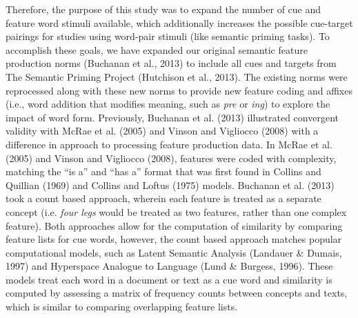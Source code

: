 \documentclass[english,,man]{apa6}
\begin{document}
Therefore, the purpose of this study was to expand the number of cue and feature word stimuli available, which additionally increases the possible cue-target pairings for studies using word-pair stimuli (like semantic priming tasks). To accomplish these goals, we have expanded our original semantic feature production norms (Buchanan et al., 2013) to include all cues and targets from The Semantic Priming Project (Hutchison et al., 2013). The existing norms were reprocessed along with these new norms to provide new feature coding and affixes (i.e., word addition that modifies meaning, such as \emph{pre} or \emph{ing}) to explore the impact of word form. Previously, Buchanan et al. (2013) illustrated convergent validity with McRae et al. (2005) and Vinson and Vigliocco (2008) with a difference in approach to processing feature production data. In McRae et al. (2005) and Vinson and Vigliocco (2008), features were coded with complexity, matching the \enquote{is a} and \enquote{has a} format that was first found in Collins and Quillian (1969) and Collins and Loftus (1975) models. Buchanan et al. (2013) took a count based approach, wherein each feature is treated as a separate concept (i.e. \emph{four legs} would be treated as two features, rather than one complex feature). Both approaches allow for the computation of similarity by comparing feature lists for cue words, however, the count based approach matches popular computational models, such as Latent Semantic Analysis (Landauer \& Dumais, 1997) and Hyperspace Analogue to Language (Lund \& Burgess, 1996). These models treat each word in a document or text as a cue word and similarity is computed by assessing a matrix of frequency counts between concepts and texts, which is similar to comparing overlapping feature lists.
\end{document}
